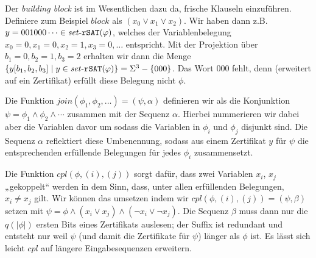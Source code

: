 Der \emph{building block} ist im Wesentlichen dazu da, frische Klauseln einzuführen. Definiere zum Beispiel $\mathit{block}$ als $(x_0\lor x_1\lor x_2)$. Wir haben dann z.B. $y=001000\cdots\in\mathit{set}\text{-}{}\mathtt{rSAT}(\varphi)$, welches der Variablenbelegung $x_0=0,x_1=0,x_2=1,x_3=0,\ldots$ entspricht. Mit der Projektion über $b_1=0,b_2=1,b_3=2$ erhalten wir dann die Menge $\{ y[b_1,b_2,b_3] \mid y\in\mathit{set}\text{-}\mathtt{rSAT}(\varphi)\} = \Sigma^3-\{000\}$. Das Wort $000$ fehlt, denn (erweitert auf ein Zertifikat) erfüllt diese Belegung nicht $\phi$.

Die Funktion $\mathit{join}(\phi_1, \phi_2, \dots)=(\psi,\alpha)$ definieren wir als die Konjunktion $\psi=\phi_1\land\phi_2\land\cdots$ zusammen mit der Sequenz $\alpha$. Hierbei nummerieren wir dabei aber die Variablen davor um sodass die Variablen in $\phi_i$ und $\phi_j$ disjunkt sind. Die Sequenz $\alpha$ reflektiert diese Umbenennung, sodass aus einem Zertifikat $y$ für $\psi$ die entsprechenden erfüllende Belegungen für jedes $\phi_i$ zusammensetzt.

Die Funktion $\mathit{cpl}(\phi, (i), (j))$ sorgt dafür, dass zwei Variablen $x_i$, $x_j$ „gekoppelt“ werden in dem Sinn, dass, unter allen erfüllenden Belegungen, $x_i\neq x_j$ gilt. Wir können das umsetzen indem wir $\mathit{cpl}(\phi, (i), (j))=(\psi, \beta)$ setzen mit $\psi=\phi\land (x_i\lor x_j) \land (\neg x_i\lor \neg x_j)$. Die Sequenz $\beta$ muss dann nur die $q(|\phi|)$ ersten Bits eines Zertifikats auslesen; der Suffix ist redundant und entsteht nur weil $\psi$ (und damit die Zertifikate für $\psi$) länger als $\phi$ ist. Es lässt sich leicht $\mathit{cpl}$ auf längere Eingabesequenzen erweitern.


